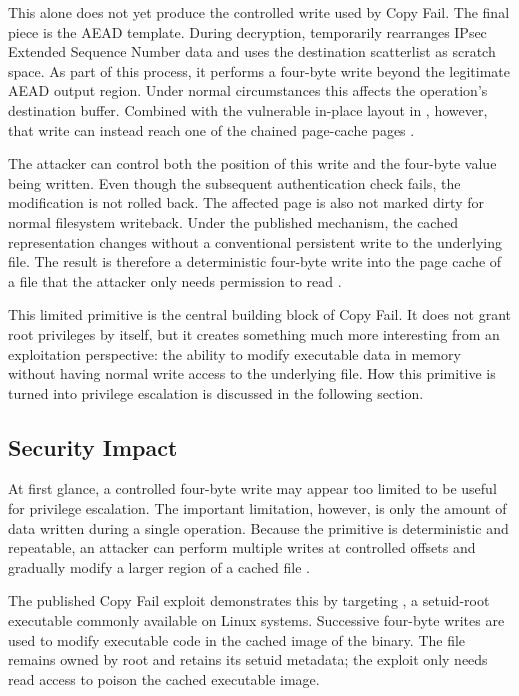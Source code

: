 This alone does not yet produce the controlled write used by Copy Fail. The
final piece is the  AEAD template. During decryption,
 temporarily rearranges IPsec Extended Sequence Number data
and uses the destination scatterlist as scratch space. As part of this process,
it performs a four-byte write beyond the legitimate AEAD output region. Under
normal circumstances this affects the operation's destination buffer. Combined
with the vulnerable in-place layout in , however, that write
can instead reach one of the chained page-cache pages
\cite{copyfail-research}.

The attacker can control both the position of this write and the four-byte
value being written. Even though the subsequent authentication check fails,
the modification is not rolled back. The affected page is also not marked
dirty for normal filesystem writeback. Under the published mechanism, the
cached representation changes without a conventional persistent write to the
underlying file. The result is therefore a deterministic four-byte write into
the page cache of a file that the attacker only needs permission to read
\cite{copyfail-research}.

This limited primitive is the central building block of Copy Fail. It does not
grant root privileges by itself, but it creates something much more interesting
from an exploitation perspective: the ability to modify executable data in
memory without having normal write access to the underlying file. How this
primitive is turned into privilege escalation is discussed in the following
section.

\subsection{Security Impact}

At first glance, a controlled four-byte write may appear too limited to be useful
for privilege escalation. The important limitation, however, is only the amount
of data written during a single operation. Because the primitive is deterministic
and repeatable, an attacker can perform multiple writes at controlled offsets and
gradually modify a larger region of a cached file
\cite{copyfail-research}.

The published Copy Fail exploit demonstrates this by targeting
, a setuid-root executable commonly available on Linux systems.
Successive four-byte writes are used to modify executable code in the cached
image of the binary. The file remains owned by root and retains its setuid
metadata; the exploit only needs read access to poison the cached executable
image.

